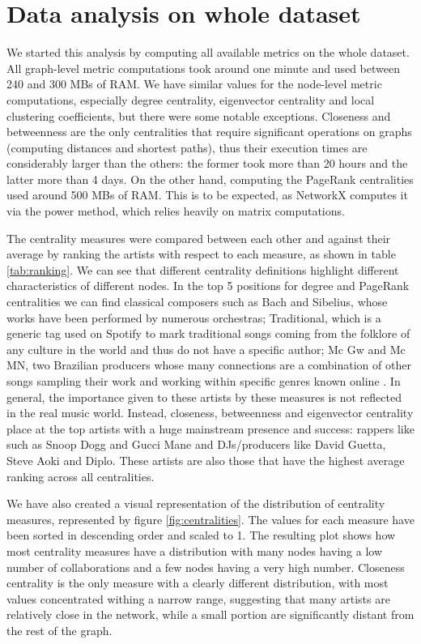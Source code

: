 \section{Data analysis on whole dataset}

We started this analysis by computing all available metrics on the whole dataset. All graph-level metric computations took around one minute and used between 240 and 300 MBs of RAM. We have similar values for the node-level metric computations, especially degree centrality, eigenvector centrality and local clustering coefficients, but there were some notable exceptions. Closeness and betweenness are the only centralities that require significant operations on graphs (computing distances and shortest paths), thus their execution times are considerably larger than the others: the former took more than 20 hours and the latter more than 4 days. On the other hand, computing the PageRank centralities used around 500 MBs of RAM. This is to be expected, as NetworkX computes it via the power method, which relies heavily on matrix computations.

The centrality measures were compared between each other and against their average by ranking the artists with respect to each measure, as shown in table \ref{tab:ranking}. We can see that different centrality definitions highlight different characteristics of different nodes. In the top 5 positions for degree and PageRank centralities we can find classical composers such as Bach and Sibelius, whose works have been performed by numerous orchestras; Traditional, which is a generic tag used on Spotify to mark traditional songs coming from the folklore of any culture in the world and thus do not have a specific author; Mc Gw and Mc MN, two Brazilian producers whose many connections are a combination of other songs sampling their work and working within specific genres known online \cite{brazilianArtists}. In general, the importance given to these artists by these measures is not reflected in the real music world. Instead, closeness, betweenness and eigenvector centrality place at the top artists with a huge mainstream presence and success: rappers like such as Snoop Dogg and Gucci Mane and DJs/producers like David Guetta, Steve Aoki and Diplo. These artists are also those that have the highest average ranking across all centralities.

We have also created a visual representation of the distribution of centrality measures, represented by figure \ref{fig:centralities}. The values for each measure have been sorted in descending order and scaled to 1. The resulting plot shows how most centrality measures have a distribution with many nodes having a low number of collaborations and a few nodes having a very high number. Closeness centrality is the only measure with a clearly different distribution, with most values concentrated withing a narrow range, suggesting that many artists are relatively close in the network, while a small portion are significantly distant from the rest of the graph.

